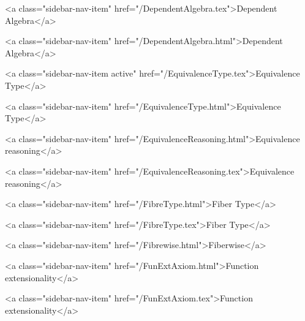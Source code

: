       
    
      
        
          <a class="sidebar-nav-item" href="/DependentAlgebra.tex">Dependent Algebra</a>
        
      
    
      
        
          <a class="sidebar-nav-item" href="/DependentAlgebra.html">Dependent Algebra</a>
        
      
    
      
        
          <a class="sidebar-nav-item active" href="/EquivalenceType.tex">Equivalence Type</a>
        
      
    
      
        
          <a class="sidebar-nav-item" href="/EquivalenceType.html">Equivalence Type</a>
        
      
    
      
        
          <a class="sidebar-nav-item" href="/EquivalenceReasoning.html">Equivalence reasoning</a>
        
      
    
      
        
          <a class="sidebar-nav-item" href="/EquivalenceReasoning.tex">Equivalence reasoning</a>
        
      
    
      
        
          <a class="sidebar-nav-item" href="/FibreType.html">Fiber Type</a>
        
      
    
      
        
          <a class="sidebar-nav-item" href="/FibreType.tex">Fiber Type</a>
        
      
    
      
        
          <a class="sidebar-nav-item" href="/Fibrewise.html">Fiberwise</a>
        
      
    
      
        
          <a class="sidebar-nav-item" href="/FunExtAxiom.html">Function extensionality</a>
        
      
    
      
        
          <a class="sidebar-nav-item" href="/FunExtAxiom.tex">Function extensionality</a>
        
